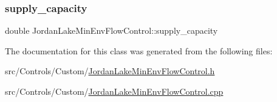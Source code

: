 \subsubsection{\texorpdfstring{supply\+\_\+capacity}{supply\_capacity}}
{\footnotesize\ttfamily double Jordan\+Lake\+Min\+Env\+Flow\+Control\+::supply\+\_\+capacity\hspace{0.3cm}{\ttfamily [private]}}



The documentation for this class was generated from the following files\+:\begin{DoxyCompactItemize}
\item 
src/\+Controls/\+Custom/\mbox{\hyperlink{JordanLakeMinEnvFlowControl_8h}{Jordan\+Lake\+Min\+Env\+Flow\+Control.\+h}}\item 
src/\+Controls/\+Custom/\mbox{\hyperlink{JordanLakeMinEnvFlowControl_8cpp}{Jordan\+Lake\+Min\+Env\+Flow\+Control.\+cpp}}\end{DoxyCompactItemize}
